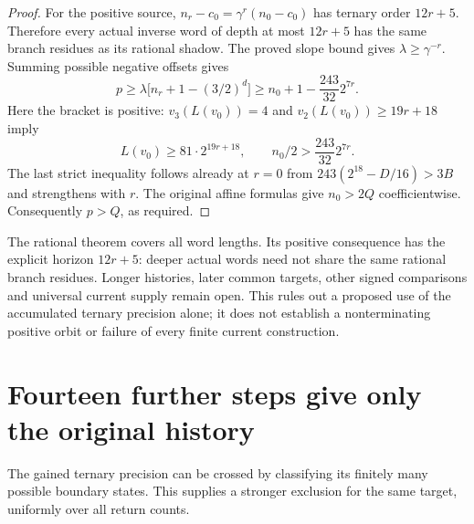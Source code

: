 \documentclass[11pt]{article}
\begin{document}
\begin{proof}
For the positive source, $n_r-c_0=\gamma^r(n_0-c_0)$ has ternary order
$12r+5$. Therefore every actual inverse word of depth at most $12r+5$
has the same branch residues as its rational shadow. The proved slope
bound gives $\lambda\ge\gamma^{-r}$.
Summing possible negative offsets gives
\[
 p\ge\lambda\bigl[n_r+1-(3/2)^d\bigr]
   \ge n_0+1-\frac{243}{32}2^{7r}.
\]
Here the bracket is positive: $v_3(L(v_0))=4$ and
$v_2(L(v_0))\ge19r+18$ imply
\[
 L(v_0)\ge81\cdot2^{19r+18},\qquad
 n_0/2>\frac{243}{32}2^{7r}.
\]
The last strict inequality follows already at $r=0$ from
$243(2^{18}-D/16)>3B$ and strengthens with $r$.
The original affine formulas give $n_0>2Q$ coefficientwise.
Consequently $p>Q$, as required.
\end{proof}

The rational theorem covers all word lengths. Its positive consequence
has the explicit horizon $12r+5$: deeper actual words need not share the
same rational branch residues. Longer histories, later common targets,
other signed comparisons and universal current supply remain open.
This rules out a proposed use of the accumulated ternary precision alone;
it does not establish a nonterminating positive orbit or failure of every
finite current construction.

\section{Fourteen further steps give only the original history}

The gained ternary precision can be crossed by classifying its finitely
many possible boundary states. This supplies a stronger exclusion for the
same target, uniformly over all return counts.
\end{document}
